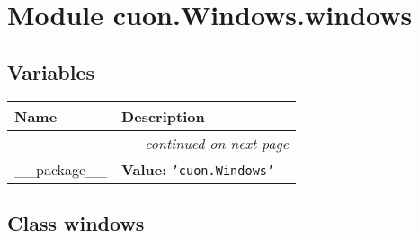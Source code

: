 %
%
%


\section{Module cuon.Windows.windows}

    \label{cuon:Windows:windows}


  \subsection{Variables}

    \vspace{-1cm}
\hspace{\varindent}\begin{longtable}{|p{\varnamewidth}|p{\vardescrwidth}|l}
\cline{1-2}
\cline{1-2} \centering \textbf{Name} & \centering \textbf{Description}& \\
\cline{1-2}
\endhead\cline{1-2}\multicolumn{3}{r}{\small\textit{continued on next page}}\\\endfoot\cline{1-2}
\endlastfoot\raggedright \_\-\_\-p\-a\-c\-k\-a\-g\-e\-\_\-\_\- & \raggedright \textbf{Value:} 
{\tt \texttt{'}\texttt{cuon.Windows}\texttt{'}}&\\
\cline{1-2}
\end{longtable}



\subsection{Class windows}

